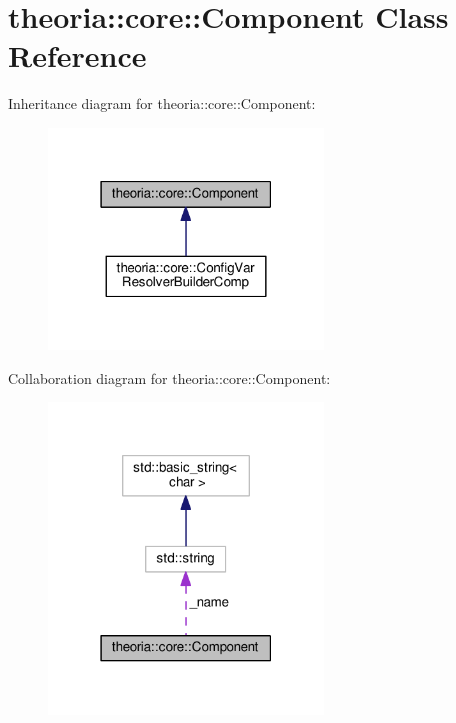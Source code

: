 \hypertarget{classtheoria_1_1core_1_1Component}{\section{theoria\+:\+:core\+:\+:Component Class Reference}
\label{classtheoria_1_1core_1_1Component}
}


Inheritance diagram for theoria\+:\+:core\+:\+:Component\+:
\nopagebreak
\begin{figure}[H]
\begin{center}
\leavevmode
\includegraphics[width=207pt]{classtheoria_1_1core_1_1Component__inherit__graph}
\end{center}
\end{figure}


Collaboration diagram for theoria\+:\+:core\+:\+:Component\+:
\nopagebreak
\begin{figure}[H]
\begin{center}
\leavevmode
\includegraphics[width=207pt]{classtheoria_1_1core_1_1Component__coll__graph}
\end{center}
\end{figure}
